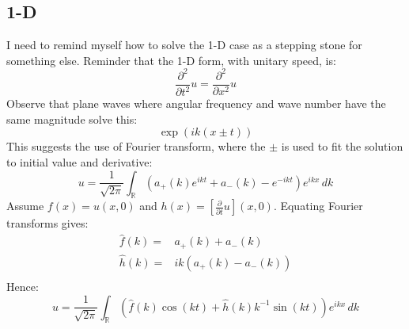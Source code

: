\subsection{1-D}
I need to remind myself how to solve the 1-D case as a stepping stone for something else.
Reminder that the 1-D form, with unitary speed, is:
\[ \frac{\partial^2}{\partial t^2} u = \frac{\partial^2}{\partial x^2}u\]
Observe that plane waves where angular frequency and wave number have the same magnitude solve this:
\[ \exp(ik(x\pm t))\]
This suggests the use of Fourier transform, where the $\pm$ is used to fit the solution to initial value and derivative:
\[ u = \frac{1}{\sqrt{2\pi}}\int_\mathbb{R}(a_+(k)e^{ikt}+a_-(k)-e^{-ikt})e^{ikx}\,dk\]
Assume $f(x) = u(x,0)$ and $h(x) = \left[\frac{\partial}{\partial t}u\right](x,0)$.
Equating Fourier transforms gives:
\begin{equation*}
\begin{aligned}
	\hat{f}(k) =& a_+(k)+a_-(k) \\
	\hat{h}(k) =& ik(a_+(k)-a_-(k)) \\
\end{aligned}
\end{equation*}
Hence:
\[ u = \frac{1}{\sqrt{2\pi}}\int_\mathbb{R}(\hat{f}(k)\cos(kt)+\hat{h}(k)k^{-1}\sin(kt))e^{ikx}\,dk\]

